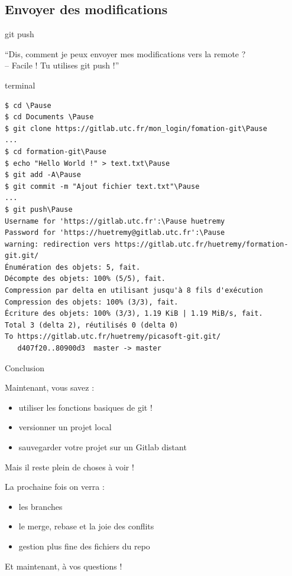 \documentclass[usepdftitle=false]{beamer}
\def\seplength{.3\topsep}
\newcommand{\Pause}{%
\ifdef{\Release}
  {\pause}
  {}
}
\begin{document}
\subsection{Envoyer des modifications}

\begin{frame}[fragile]{git push}
	\begin{block}{}
		\enquote{Dis, comment je peux envoyer mes modifications vers la remote ? \\ -- Facile ! Tu utilises git push !}
	\end{block}
	\begin{beamercolorbox}[rounded=true,shadow=true]{terminal}
		\vspace{-\seplength}
		\begin{Verbatim}
$ cd \Pause
$ cd Documents \Pause
$ git clone https://gitlab.utc.fr/mon_login/fomation-git\Pause
...
$ cd formation-git\Pause
$ echo "Hello World !" > text.txt\Pause
$ git add -A\Pause
$ git commit -m "Ajout fichier text.txt"\Pause
...
$ git push\Pause
Username for 'https://gitlab.utc.fr':\Pause huetremy
Password for 'https://huetremy@gitlab.utc.fr':\Pause
warning: redirection vers https://gitlab.utc.fr/huetremy/formation-git.git/
Énumération des objets: 5, fait.
Décompte des objets: 100% (5/5), fait.
Compression par delta en utilisant jusqu'à 8 fils d'exécution
Compression des objets: 100% (3/3), fait.
Écriture des objets: 100% (3/3), 1.19 KiB | 1.19 MiB/s, fait.
Total 3 (delta 2), réutilisés 0 (delta 0)
To https://gitlab.utc.fr/huetremy/picasoft-git.git/
   d407f20..80900d3  master -> master
		\end{Verbatim}
	\end{beamercolorbox}
\end{frame}

\begin{frame}{Conclusion}

	Maintenant, vous savez :
	\begin{itemize}
		\item utiliser les fonctions basiques de git !
		\item versionner un projet local
		\item sauvegarder votre projet sur un Gitlab distant
	\end{itemize}

	\vfill

	Mais il reste plein de choses à voir !

	\vfill

	La prochaine fois on verra :
	\begin{itemize}
		\item les branches
		\item le merge, rebase et la joie des conflits
		\item gestion plus fine des fichiers du repo
	\end{itemize}

	\vfill

	Et maintenant, à vos questions !

\end{frame}
\end{document}
